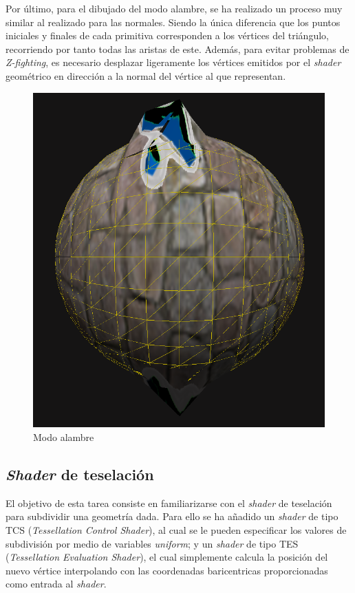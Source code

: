 \documentclass[10pt,oneside,a4paper]{article}
\begin{document}
Por último, para el dibujado del modo alambre, se ha realizado un proceso muy similar al realizado para las normales. Siendo la única diferencia que los puntos iniciales y finales de cada primitiva corresponden a los vértices del triángulo, recorriendo por tanto todas las aristas de este. Además, para evitar problemas de \textit{Z-fighting}, es necesario desplazar ligeramente
los vértices emitidos por el \textit{shader} geométrico en dirección a la normal del vértice al que representan.\\

\begin{figure}[htbp]
\centering
\includegraphics[width=.6\linewidth]{pgatrimgs/WireFrame.png}
\caption{Modo alambre}
\end{figure}


\subsection{\textit{Shader} de teselación}
El objetivo de esta tarea consiste en familiarizarse con el \textit{shader} de teselación para subdividir una geometría dada.
Para ello se ha añadido un \textit{shader} de tipo TCS (\textit{Tessellation Control Shader}), al cual se le pueden especificar los valores de subdivisión por medio de variables \textit{uniform};
y un \textit{shader} de tipo TES (\textit{Tessellation Evaluation Shader}), el cual simplemente calcula la posición del nuevo vértice interpolando con las coordenadas baricentricas proporcionadas como entrada al \textit{shader}.\\
\end{document}
